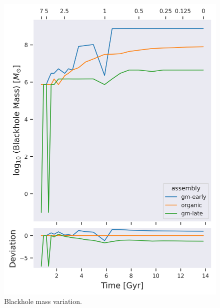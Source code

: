 \documentclass[twocolumn]{article}
\begin{document}
	\begin{figure}
			\centering 
			\includegraphics[width=\columnwidth]{./BH_mass.png}
			\caption{Blackhole mass variation.}
	\end{figure}
\end{document}
